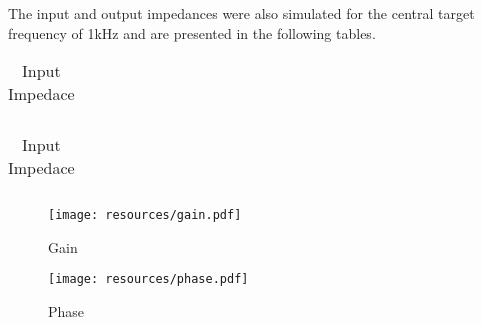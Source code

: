 The input and output impedances were also simulated for the central target frequency of 1kHz and are presented in the following tables. 


\begin{table}[!htb]
\parbox{.45\linewidth}{
  \centering
  \begin{tabular}{|l|l|}
    \hline    
    
  \end{tabular}
  \caption{Output Impedace}
}
\hfill
\parbox{.45\linewidth}{
  \centering
  \begin{tabular}{|l|l|}
    \hline    
    
  \end{tabular}
  \caption{Input Impedace}
}
\end{table}




\FloatBarrier  
\begin{figure} [!htb] 
  \texttt{[image: resources/gain.pdf]}
  \caption{Gain}
  \label{fig:theoplots}
  \hfill
\end{figure}

\begin{figure} [!htb] 
  \texttt{[image: resources/phase.pdf]}
  \caption{Phase}
  \label{fig:theoplots}
  \endminipage
  \hfill
\end{figure}
\FloatBarrier


